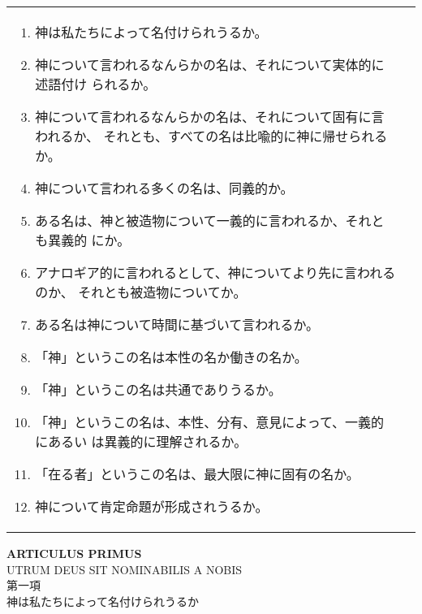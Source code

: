 \documentclass[10pt]{jsarticle}
\begin{document}
\begin{longtable}{p{21em}p{21em}}
\vspace{1.3em}
\begin{enumerate}
 \item 神は私たちによって名付けられうるか。
 \item 神について言われるなんらかの名は、それについて実体的に述語付け
 られるか。
 \item 神について言われるなんらかの名は、それについて固有に言われるか、
       それとも、すべての名は比喩的に神に帰せられるか。
 \item 神について言われる多くの名は、同義的か。
 \item ある名は、神と被造物について一義的に言われるか、それとも異義的
 にか。
 \item アナロギア的に言われるとして、神についてより先に言われるのか、
 それとも被造物についてか。
 \item ある名は神について時間に基づいて言われるか。
 \item 「神」というこの名は本性の名か働きの名か。
 \item 「神」というこの名は共通でありうるか。
 \item 「神」というこの名は、本性、分有、意見によって、一義的にあるい
 は異義的に理解されるか。
 \item 「在る者」というこの名は、最大限に神に固有の名か。
 \item 神について肯定命題が形成されうるか。
\end{enumerate}
\end{longtable}

\newpage
{}
\begin{center}
{\Large {\bf ARTICULUS PRIMUS}\\
UTRUM DEUS SIT NOMINABILIS A NOBIS}\\
{\large 第一項\\神は私たちによって名付けられうるか}
\end{center}
\end{document}
